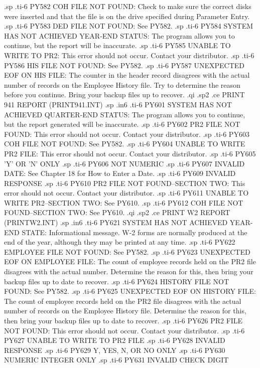 .sp
.ti-6
PY582 COH FILE NOT FOUND: Check to make sure the correct disks were inserted
and that the file is on the drive specified during Parameter Entry.
.sp
.ti-6
PY583 DED FILE NOT FOUND: See PY582.
.sp
.ti-6
PY584 SYSTEM HAS NOT ACHIEVED YEAR-END STATUS: The program allows you to
continue, but the report will be inaccurate.
.sp
.ti-6
PY585 UNABLE TO WRITE TO PR2: This error should not occur.  Contact your
distributor.
.sp
.ti-6
PY586 HIS FILE NOT FOUND: See PY582.
.sp
.ti-6
PY587 UNEXPECTED EOF ON HIS FILE: The counter in the header record disagrees
with the actual number of records on the Employee History file.  Try to
determine the reason before you continue.  Bring your backup files up to
recover.
.qi
.sp2
.ce
PRINT 941 REPORT (PRINT941.INT)
.sp
.in6
.ti-6
PY601 SYSTEM HAS NOT ACHIEVED QUARTER-END STATUS: The program allows you to
continue, but the report generated will be inaccurate.
.sp
.ti-6
PY602 PR2 FILE NOT FOUND: This error should not occur.	Contact your
distributor.
.sp
.ti-6
PY603 COH FILE NOT FOUND: See PY582.
.sp
.ti-6
PY604 UNABLE TO WRITE PR2 FILE: This error should not occur.  Contact your
distributor.
.sp
.ti-6
PY605 'Y' OR 'N' ONLY
.sp
.ti-6
PY606 NOT NUMERIC
.sp
.ti-6
PY607 INVALID DATE: See Chapter 18 for How to Enter a Date.
.sp
.ti-6
PY609 INVALID RESPONSE
.sp
.ti-6
PY610 PR2 FILE NOT FOUND--SECTION TWO: This error should not occur.  Contact
your distributor.
.sp
.ti-6
PY611 UNABLE TO WRITE PR2--SECTION TWO:  See PY610.
.sp
.ti-6
PY612 COH FILE NOT FOUND--SECTION TWO: See PY610.
.qi
.sp2
.ce
PRINT W2 REPORT (PRINTW2.INT)
.sp
.in6
.ti-6
PY621 SYSTEM HAS NOT ACHIEVED YEAR-END STATE:  Informational message.  W-2
forms are normally produced at the end of the year, although they may be
printed at any time.
.sp
.ti-6
PY622 EMPLOYEE FILE NOT FOUND: See PY582.
.sp
.ti-6
PY623 UNEXPECTED EOF ON EMPLOYEE FILE:	The count of employee records held
on the PR2 file disagrees with the actual number.  Determine the reason
for this, then bring your backup files up to date to recover.
.sp
.ti-6
PY624 HISTORY FILE NOT FOUND: See PY582.
.sp
.ti-6
PY625 UNEXPECTED EOF ON HISTORY FILE:  The count of employee records held
on the PR2 file disagrees with the actual number of records on the
Employee History file.	Determine the reason for this, then bring your
backup files up to date to recover.
.sp
.ti-6
PY626 PR2 FILE NOT FOUND: This error should not occur.	Contact your
distributor.
.sp
.ti-6
PY627 UNABLE TO WRITE TO PR2 FILE
.sp
.ti-6
PY628 INVALID RESPONSE
.sp
.ti-6
PY629 Y, YES, N, OR NO ONLY
.sp
.ti-6
PY630 NUMERIC INTEGER ONLY
.sp
.ti-6
PY631 INVALID CHECK DIGIT
